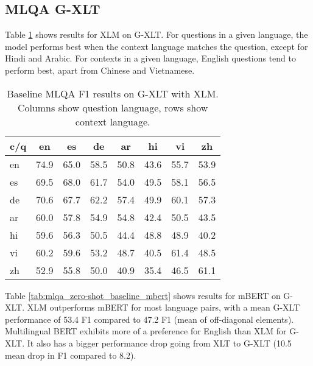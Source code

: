 \documentclass[11pt]{article}
\begin{document}
\subsection{MLQA G-XLT}

Table \ref{tab:mlqa_zero-shot_baseline_xlm} shows results for XLM on G-XLT. For questions in a given language, the model performs best when the context language matches the question, except for Hindi and Arabic. For contexts in a given language, English questions tend to
perform best, apart from Chinese and Vietnamese.

\begin{table}[ht]
\centering
\begin{adjustbox}{max width=\columnwidth}
\begin{tabular}{l|ccccccc}
\toprule
c/q & en   & es   & de   & ar   & hi   & vi   & zh   \\ \midrule
en  & 74.9 & 65.0 & 58.5 & 50.8 & 43.6 & 55.7 & 53.9 \\
es  & 69.5 & 68.0 & 61.7 & 54.0 & 49.5 & 58.1 & 56.5 \\
de  & 70.6 & 67.7 & 62.2 & 57.4 & 49.9 & 60.1 & 57.3 \\
ar  & 60.0 & 57.8 & 54.9 & 54.8 & 42.4 & 50.5 & 43.5 \\
hi  & 59.6 & 56.3 & 50.5 & 44.4 & 48.8 & 48.9 & 40.2 \\
vi  & 60.2 & 59.6 & 53.2 & 48.7 & 40.5 & 61.4 & 48.5 \\
zh  & 52.9 & 55.8 & 50.0 & 40.9 & 35.4 & 46.5 & 61.1 \\ \bottomrule
\end{tabular}
\end{adjustbox}
\caption{Baseline MLQA F1 results on G-XLT with XLM. Columns show question language, rows show context language.}
\label{tab:mlqa_zero-shot_baseline_xlm}
\end{table}

Table \ref{tab:mlqa_zero-shot_baseline_mbert} shows results for mBERT on  G-XLT. XLM outperforms mBERT for most language pairs, with a mean G-XLT performance of 53.4 F1 compared to 47.2 F1 (mean of off-diagonal elements). Multilingual BERT exhibits more of a preference for English than XLM for G-XLT. It also has a bigger performance drop going from XLT to G-XLT (10.5 mean drop in F1 compared to 8.2).
\end{document}
